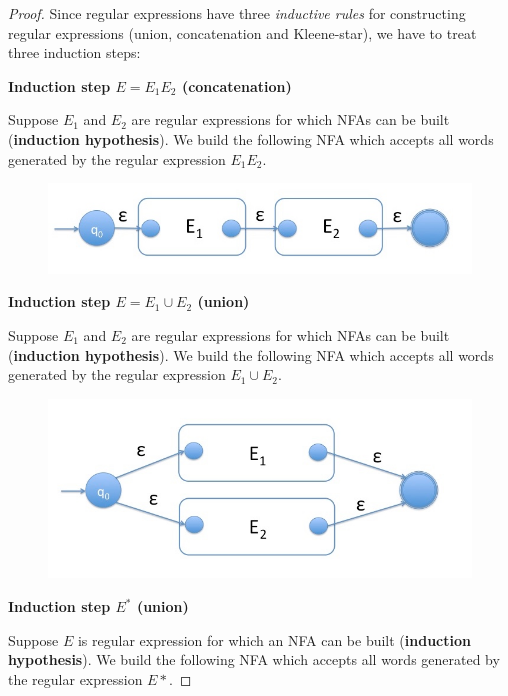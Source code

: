 \documentclass[a4paper, 12pt]{article}
\begin{document}
\begin{proof}
Since regular expressions have three \textit{inductive rules} for constructing regular expressions (union, concatenation and Kleene-star), we have to treat three induction steps:

\textbf{Induction step $E=E_1E_2$ (concatenation)}

Suppose $E_1$ and $E_2$ are regular expressions for which NFAs can be built (\textbf{induction hypothesis}). We build the following NFA which accepts all words generated by the regular expression $E_1E_2$.


\begin{figure}[!htb]
\centering
\includegraphics[max width=\textwidth]{:lfa:concat.jpg}
\end{figure}



\textbf{Induction step $E=E_1\cup E_2$ (union)}

Suppose $E_1$ and $E_2$ are regular expressions for which NFAs can be built (\textbf{induction hypothesis}). We build the following NFA which accepts all words generated by the regular expression $E_1\cup E_2$.


\begin{figure}[!htb]
\centering
\includegraphics[max width=\textwidth]{:lfa:union.jpg}
\end{figure}


\textbf{Induction step $E^*$ (union)}

Suppose $E$ is regular expression for which an NFA can be built (\textbf{induction hypothesis}). We build the following NFA which accepts all words generated by the regular expression $E*$.



\end{proof}
\end{document}
